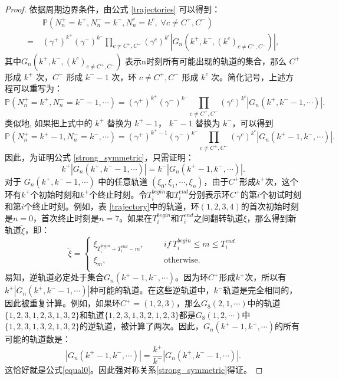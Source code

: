 \begin{proof}
    依据周期边界条件，由公式 \eqref{trajectories} 可以得到：
    \begin{align*}
        &\;\mathbb{P}\left(N^+_n=k^+,N^-_n=k^-,N^c_n=k^c,\;\forall c\neq C^+,C^-\right)\\
        =&\; (\gamma^+)^{k^+}(\gamma^-)^{k^-}\prod_{c\neq C^+,C^-}
        \left(\gamma^c\right)^{k^c}\left|G_n(k^+,k^-,(k^c)_{c\neq C^+,C^-})\right|,
    \end{align*}
    其中$G_n(k^+,k^-,(k^c)_{c\neq C^+,C^-})$ 表示n时刻所有可能出现的轨道的集合，那么 $C^+$ 形成 $k^+$ 次，$C^-$ 形成 $k^- -1$ 次，环 $c\neq C^+,C^-$ 形成 $k^c$ 次。简化记号，上述方程可以重写为：
    \begin{equation}\label{temp1}
        \mathbb{P}\left(N^+_n=k^+,N^-_n=k^- -1,\cdots\right)
        = (\gamma^+)^{k^+}(\gamma^-)^{k^-}\prod_{c\neq C^+,C^-}\left(\gamma^c\right)^{k^c}|G_n(k^+,k^- -1,\cdots)|.
    \end{equation}
    类似地, 如果把上式中的 $k^+$ 替换为 $k^+ -1$， $k^- -1$ 替换为 $k^-$，可以得到
    \begin{equation}\label{temp2}
    \mathbb{P}\left(N^+_n=k^+ -1,N^-_n=k^-,\cdots\right)
    = (\gamma^+)^{k^+ -1}(\gamma^-)^{k^-}\prod_{c\neq C^+,C^-}\left(\gamma^c\right)^{k^c}|G_n(k^+ -1,k^-,\cdots)|.
    \end{equation}
    因此，为证明公式 \ref{strong_symmetric}，只需证明：
    \begin{equation} \label{equal0}
        k^+ |G_n(k^+, k^- -1, \cdots)| = k^-|G_n(k^+ -1,k^-,\cdots)|.
    \end{equation}
    对于 $G_n(k^+,k^- -1,\cdots)$ 中的任意轨道 $(\xi_0,\xi_1,\cdots,\xi_n)$，由于$C^+$形成$k^+$次，这个环有$k^+$个初始时刻和$k^+$个终止时刻。令$T_i^{begin}$和$T_i^{end}$分别表示环$C^+$的第$i$个初试时刻和第$i$个终止时刻。例如，表 \ref{trajectory}中的轨道，环$(1,2,3,4)$的首次初始时刻是$n=0$，首次终止时刻是$n=7$。如果在$T_i^{begin}$和$T_i^{end}$之间翻转轨道$\xi$，那么得到新轨道$\tilde{\xi}$，即：
    \begin{equation*}
        \tilde{\xi}
        =\left\{\begin{aligned}
            \xi_{T_i^{begin}+T_i^{end}-m},&   &&if ~ T_i^{begin} \le m \le T_i^{end}\\
            \xi_m, &   && \text{otherwise}.\\
            \end{aligned}\right.
    \end{equation*}
    易知，逆轨道必定处于集合$G_n(k^+ -1,k^-,\cdots)$。因为环$C^+$形成$k^+$次，所以有$k^+|G_n(k^+,k^- -1, \cdots)|$种可能的轨道。在这些逆轨道中，$k^-$轨道是完全相同的，因此被重复计算。例如，如果环$C^+=(1,2,3)$，那么$G_8(2,1,\cdots)$中的轨道$\{1,2,3,1,2,3,1,3,2\}$和轨道$\{1,2,3,1,3,2,1,2,3\}$都是$G_8(1,2,\cdots)$中$\{1,2,3,1,3,2,1,3,2\}$的逆轨道，被计算了两次。因此，$G_n(k^+ -1,k^-,\cdots)$的所有可能的轨道数是：
    \begin{equation}\label{equal}
        |G_n(k^+ -1,k^-,\cdots)| = \frac{k^+}{k^-}|G_n(k^+,k^- -1,\cdots)|.
    \end{equation}
    这恰好就是公式\ref{equal0}。因此强对称关系\ref{strong_symmetric}得证。
\end{proof}

